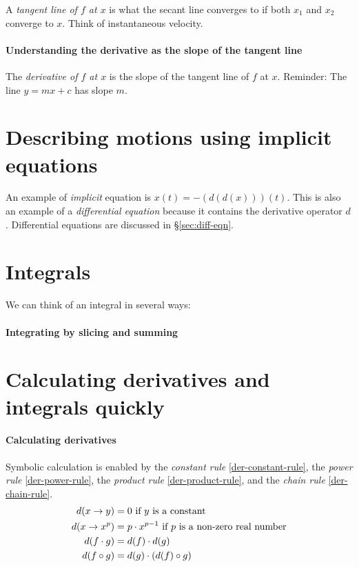 A \emph{tangent line of \(f\) at \(x\)} is what the secant line converges to
if both \(x_1\) and \(x_2\) converge to \(x\).
Think of instantaneous velocity.

\paragraph{Understanding the derivative as the slope of the tangent line}

The \emph{derivative of \(f\) at \(x\)} is the slope of the tangent line of \(f\) at \(x\).
Reminder: The line \(y = mx + c\) has slope \(m\).

\section{Describing motions using implicit equations}

An example of \emph{implicit} equation is \( x(t) = - (d(d(x)))(t) \).
This is also an example of a \emph{differential equation} because it contains the derivative operator \(d\).
Differential equations are discussed in \S\ref{sec:diff-eqn}.

\section{Integrals}

We can think of an integral in several ways:

\paragraph{Integrating by slicing and summing}

\section{Calculating derivatives and integrals quickly}

\paragraph{Calculating derivatives}

Symbolic calculation is enabled by
the \emph{constant rule} \eqref{der-constant-rule},
the \emph{power rule} \eqref{der-power-rule},
the \emph{product rule} \eqref{der-product-rule},
and the \emph{chain rule} \eqref{der-chain-rule}.
\begin{align}
    d (x \to y) &= 0 \text{ if \( y \) is a constant} \label{der-constant-rule}
    \\ d (x \to x^p) &= p \cdot x^{p-1} \text{ if \( p \) is a non-zero real number} \label{der-power-rule}
    \\ d(f \cdot g) &= d(f) \cdot d(g) \label{der-product-rule}
    \\ d(f \circ g) &= d(g) \cdot (d(f) \circ g) \label{der-chain-rule}
\end{align}


